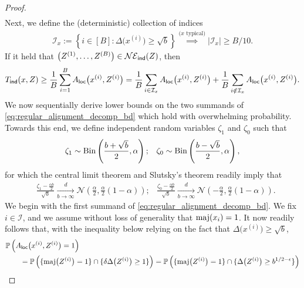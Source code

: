 \documentclass[11pt]{amsart}
\numberwithin{equation}{section}
\numberwithin{equation}{section}
\newcommand{\1}{\mathbbm{1}}
\newcommand{\Prob}{\mathbb{P}}
\newcommand{\Bin}{\textup{Bin}}
\newcommand{\maj}{\textup{maj}}
\newcommand{\ind}{\textup{\textsf{ind}}}
\newcommand{\loc}{\textup{\textsf{loc}}}
\theoremstyle{definition}
\begin{document}
\begin{appendices}
\begin{proof}
\begin{align}
    \end{align}
    Next, we define the (deterministic) collection of indices
    \begin{align} \label{eq:RAP_I_lb}
        \mathcal I_x := \left\{ i \in [B] : \Delta\big( x^{(i)} \big) \geq \sqrt{b} \right\} \stackrel{\text{($x$ typical)}}{\implies} \left| \mathcal I_x \right| \geq B/10.
    \end{align}
    If it held that $\big(Z^{(1)}, \dots, Z^{(B)}\big) \in \mathcal{NE}_\ind(Z)$, then
    \begin{align} \label{eq:regular_alignment_decomp_bd}
        T_\ind(x, Z) \geq \frac{1}{B} \sum_{i=1}^B A_\loc\big(x^{(i)}, Z^{(i)}\big) = \frac{1}{B} \sum_{i \in \mathcal I_x} A_\loc\big(x^{(i)}, Z^{(i)}\big) + \frac{1}{B} \sum_{i \notin \mathcal I_x} A_\loc\big(x^{(i)}, Z^{(i)}\big).
    \end{align}
    We now sequentially derive lower bounds on the two summands of \eqref{eq:regular_alignment_decomp_bd} which hold with overwhelming probability. Towards this end, we define independent random variables $\zeta_1$ and $\zeta_0$ such that
    \begin{align} \label{eq:RAP_binom_RVs}
        & \zeta_1 \sim \Bin\left( \frac{b+\sqrt{b}}{2} , \alpha \right);
        & \zeta_0 \sim \Bin\left( \frac{b-\sqrt{b}}{2} , \alpha \right),
    \end{align}
    for which the central limit theorem and Slutsky's theorem readily imply that
    \begin{align*}
        & \frac{\zeta_1 - \frac{\alpha b}{2}}{\sqrt{b}} \xrightarrow[b \to \infty]{d} \mathcal N\left( \frac{\alpha}{2}, \frac{\alpha}{2}(1 - \alpha) \right);
        & \frac{\zeta_0 - \frac{\alpha b}{2}}{\sqrt{b}}  \xrightarrow[b \to \infty]{d} \mathcal N\left( -\frac{\alpha}{2}, \frac{\alpha}{2}(1 - \alpha) \right).
    \end{align*}
    We begin with the first summand of \eqref{eq:regular_alignment_decomp_bd}. We fix $i \in \mathcal I$, and we assume without loss of generality that $\maj(x_i) = 1$. It now readily follows that, with the inequality below relying on the fact that $\Delta\big( x^{(i)} \big) \geq \sqrt{b}$, 
    \begin{align}
        & \Prob\left( A_\loc\big(x^{(i)}, Z^{(i)}\big) = 1 \right) \nonumber \\
        & \qquad = \Prob\left( \{ \maj\big(Z^{(i)}\big) = 1 \} \cap \{ \delta \Delta\big(Z^{(i)}\big) \geq 1 \} \right) = \Prob\left( \{ \maj\big(Z^{(i)}\big) = 1 \} \cap \{ \Delta\big(Z^{(i)}\big) \geq b^{1/2-\epsilon} \} \right) \nonumber \\

\end{align}
\end{proof}
\end{appendices}
\end{document}
